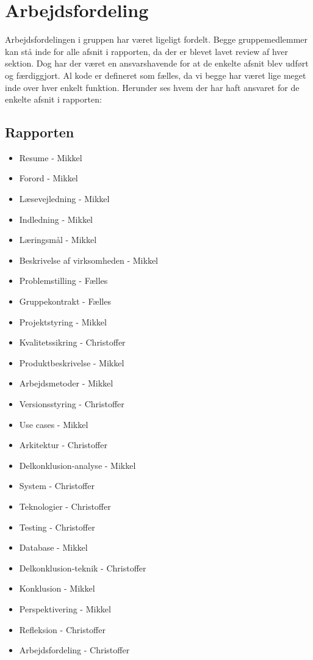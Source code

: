 \section{Arbejdsfordeling}
Arbejdsfordelingen i gruppen har været ligeligt fordelt. Begge gruppemedlemmer kan stå inde for alle afsnit i rapporten,
da der er blevet lavet review af hver sektion. 
Dog har der været en ansvarshavende for at de enkelte afsnit blev udført og færdiggjort.
Al kode er defineret som fælles, da vi begge har været lige meget inde over hver enkelt funktion.
Herunder ses hvem der har haft ansvaret for de enkelte afsnit i rapporten:
\subsection{Rapporten}
\begin{itemize}
    \item{Resume - Mikkel}
    \item{Forord - Mikkel}
    \item{Læsevejledning - Mikkel}
    \item{Indledning - Mikkel}
    \item{Læringsmål - Mikkel}
    \item{Beskrivelse af virksomheden - Mikkel}
    \item{Problemstilling - Fælles}
    \item{Gruppekontrakt - Fælles}
    \item{Projektstyring - Mikkel}
    \item{Kvalitetssikring - Christoffer}
    \item{Produktbeskrivelse - Mikkel}
    \item{Arbejdsmetoder - Mikkel}
    \item{Versionsstyring - Christoffer}
    \item{Use cases - Mikkel}
    \item{Arkitektur - Christoffer}
    \item{Delkonklusion-analyse - Mikkel}
    \item{System - Christoffer}
    \item{Teknologier - Christoffer}
    \item{Testing - Christoffer}
    \item{Database - Mikkel}
    \item{Delkonklusion-teknik - Christoffer}
    \item{Konklusion - Mikkel}
    \item{Perspektivering - Mikkel}
    \item{Refleksion - Christoffer}
    \item{Arbejdsfordeling - Christoffer}
\end{itemize}
